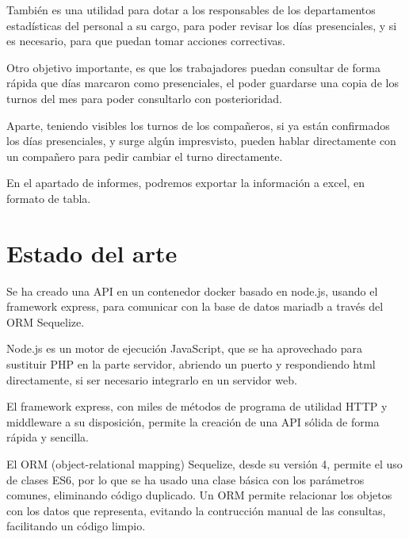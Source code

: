 \documentclass[11pt,spanish,listoffigures,listoftables]{tfgetsinf}
\begin{document}
También es una utilidad para dotar a los responsables de los departamentos estadísticas del personal a su cargo, para poder revisar los días presenciales, y si es necesario, para que puedan tomar acciones correctivas.

Otro objetivo importante, es que los trabajadores puedan consultar de forma rápida que días marcaron como presenciales, el poder guardarse una copia de los turnos del mes para poder consultarlo con posterioridad.

Aparte, teniendo visibles los turnos de los compañeros, si ya están confirmados los días presenciales, y surge algún impresvisto, pueden hablar directamente con un compañero para pedir cambiar el turno directamente.

En el apartado de informes, podremos exportar la información a excel, en formato de tabla.





\chapter{Estado del arte}

Se ha creado una API en un contenedor docker basado en node.js, usando el framework express, para comunicar con la base de datos mariadb a través del ORM Sequelize.  

Node.js es un motor de ejecución JavaScript, que se ha aprovechado para sustituir PHP en la parte servidor, abriendo un puerto y respondiendo html directamente, si ser necesario integrarlo en un servidor web. 

El framework express, con miles de métodos de programa de utilidad HTTP y middleware a su disposición, permite la creación de una API sólida de forma rápida y sencilla.

El ORM (object-relational mapping) Sequelize, desde su versión 4, permite el uso de clases ES6, por lo que se ha usado una clase básica con los parámetros comunes, eliminando código duplicado. 
Un ORM permite relacionar los objetos con los datos que representa, evitando la contrucción manual de las consultas, facilitando un código limpio.
\end{document}
